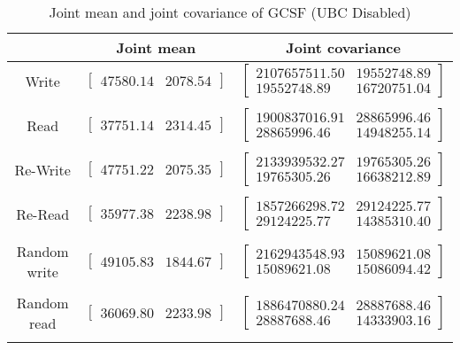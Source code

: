
	\begin{table}
	\caption{Joint mean and joint covariance of GCSF (UBC Disabled)}
	\begin{tabular}{| c | c | c |}
	\hline
	{} & \textbf{Joint mean} & \textbf{Joint covariance}\\
	\hline
	\hline
Write & $\left[ \begin{array}{rr} 47580.14 & 2078.54 \end{array}\right] $ & $\left[ \begin{array}{rr} 2107657511.50 & 19552748.89 \\ 19552748.89 & 16720751.04 \end{array}\right] $\\ 
{} & {} & {} \\ 
Read & $\left[ \begin{array}{rr} 37751.14 & 2314.45 \end{array}\right] $ & $\left[ \begin{array}{rr} 1900837016.91 & 28865996.46 \\ 28865996.46 & 14948255.14 \end{array}\right] $\\ 
{} & {} & {} \\ 
Re-Write & $\left[ \begin{array}{rr} 47751.22 & 2075.35 \end{array}\right] $ & $\left[ \begin{array}{rr} 2133939532.27 & 19765305.26 \\ 19765305.26 & 16638212.89 \end{array}\right] $\\ 
{} & {} & {} \\ 
Re-Read & $\left[ \begin{array}{rr} 35977.38 & 2238.98 \end{array}\right] $ & $\left[ \begin{array}{rr} 1857266298.72 & 29124225.77 \\ 29124225.77 & 14385310.40 \end{array}\right] $\\ 
{} & {} & {} \\ 
Random write & $\left[ \begin{array}{rr} 49105.83 & 1844.67 \end{array}\right] $ & $\left[ \begin{array}{rr} 2162943548.93 & 15089621.08 \\ 15089621.08 & 15086094.42 \end{array}\right] $\\ 
{} & {} & {} \\ 
Random read & $\left[ \begin{array}{rr} 36069.80 & 2233.98 \end{array}\right] $ & $\left[ \begin{array}{rr} 1886470880.24 & 28887688.46 \\ 28887688.46 & 14333903.16 \end{array}\right] $\\ 
{} & {} & {} \\ 

	\hline
	\end{tabular}
	\label{tbl:stat-gcsf_ubc_disabled}
	\end{table}
